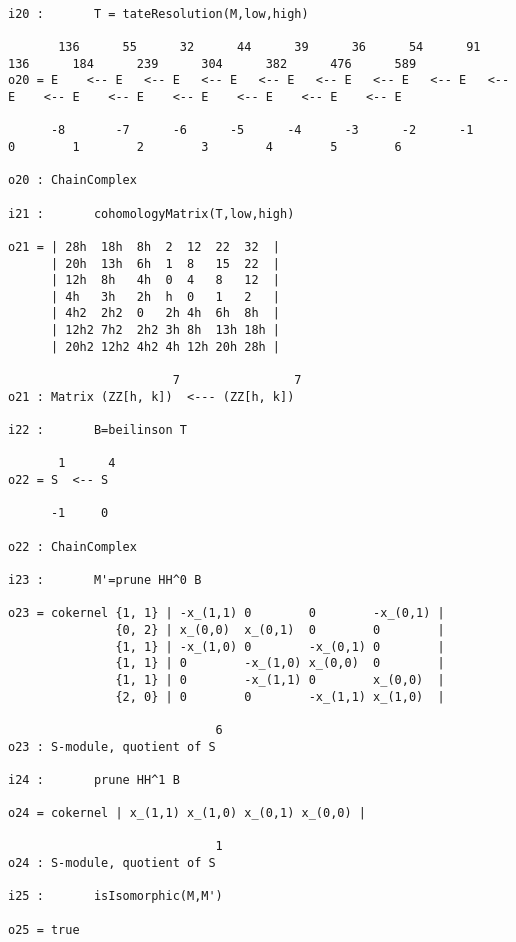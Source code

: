 \documentclass[twoside,12pt, leqno]{amsart}
\begin{document}
\begin{verbatim}
 
i20 :       T = tateResolution(M,low,high) 

       136      55      32      44      39      36      54      91      136      184      239      304      382      476      589
o20 = E    <-- E   <-- E   <-- E   <-- E   <-- E   <-- E   <-- E   <-- E    <-- E    <-- E    <-- E    <-- E    <-- E    <-- E
                                                                                                                              
      -8       -7      -6      -5      -4      -3      -2      -1      0        1        2        3        4        5        6

o20 : ChainComplex

i21 :       cohomologyMatrix(T,low,high)

o21 = | 28h  18h  8h  2  12  22  32  |
      | 20h  13h  6h  1  8   15  22  |
      | 12h  8h   4h  0  4   8   12  |
      | 4h   3h   2h  h  0   1   2   |
      | 4h2  2h2  0   2h 4h  6h  8h  |
      | 12h2 7h2  2h2 3h 8h  13h 18h |
      | 20h2 12h2 4h2 4h 12h 20h 28h |

                       7                7
o21 : Matrix (ZZ[h, k])  <--- (ZZ[h, k])

i22 :       B=beilinson T

       1      4
o22 = S  <-- S
              
      -1     0

o22 : ChainComplex

i23 :       M'=prune HH^0 B

o23 = cokernel {1, 1} | -x_(1,1) 0        0        -x_(0,1) |
               {0, 2} | x_(0,0)  x_(0,1)  0        0        |
               {1, 1} | -x_(1,0) 0        -x_(0,1) 0        |
               {1, 1} | 0        -x_(1,0) x_(0,0)  0        |
               {1, 1} | 0        -x_(1,1) 0        x_(0,0)  |
               {2, 0} | 0        0        -x_(1,1) x_(1,0)  |

                             6
o23 : S-module, quotient of S

i24 :       prune HH^1 B

o24 = cokernel | x_(1,1) x_(1,0) x_(0,1) x_(0,0) |

                             1
o24 : S-module, quotient of S

i25 :       isIsomorphic(M,M')

o25 = true
  \end{verbatim}
\end{document}

